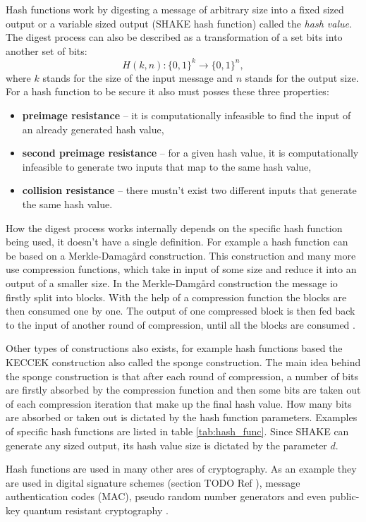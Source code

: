 Hash functions work by digesting a message of arbitrary size into a fixed sized output or a variable sized output (SHAKE hash function) called the \textit{hash value}. The digest process can also be described as a transformation of a set bits into another set of bits:
\begin{equation}
  H(k, n): \{0,1\}^k \rightarrow \{0,1\}^n,
\end{equation}
where $k$ stands for the size of the input message and $n$ stands for the output size. For a hash function to be secure it also must posses these three properties\cite{Paar2010}:
\begin{itemize}
  \item \textbf{preimage resistance} -- it is computationally infeasible to find the input of an already generated hash value,
  \item \textbf{second preimage resistance} -- for a given hash value, it is computationally infeasible to generate two inputs that map to the same hash value,
  \item \textbf{collision resistance} -- there mustn't exist two different inputs that generate the same hash value.
\end{itemize}

How the digest process works internally depends on the specific hash function being used, it doesn't have a single definition. For example a hash function can be based on a Merkle-Damag\aa rd construction. This construction and many more use compression functions, which take in input of some size and reduce it into an output of a smaller size. In the Merkle-Damg\aa rd construction the message io firstly split into blocks. With the help of a compression function the blocks are then consumed one by one. The output of one compressed block is then fed back to the input of another round of compression, until all the blocks are consumed \cite{Smart2004}. 

Other types of constructions also exists, for example hash functions based the KECCEK construction also called the sponge construction. The main idea behind the sponge construction is that after each round of compression, a number of bits are firstly absorbed by the compression function and then some bits are taken out of each compression iteration that make up the final hash value. How many bits are absorbed or taken out is dictated by the hash function parameters. \cite{1Od8f4TuMxetfmHu} Examples of specific hash functions are listed in table \ref{tab:hash_func}. Since SHAKE can generate any sized output, its hash value size is dictated by the parameter $d$.


Hash functions are used in many other ares of cryptography. As an example they are used in digital signature schemes (section TODO Ref ), message authentication codes (\acs{MAC}), pseudo random number generators and even public-key quantum resistant cryptography \cite{Chen2016}. 


